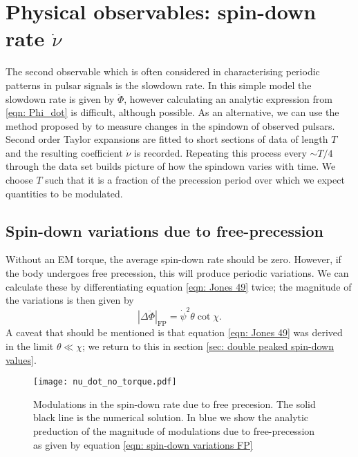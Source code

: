 \documentclass[/home/greg/Thesis/main/main.tex]{subfiles}
\begin{document}
\graphicspath{{/home/greg/Neutron_star_modelling/SpindownRate/img/}}

\section{Physical observables: spin-down rate $\dot{\nu}$}

The second observable which is often considered in characterising periodic
patterns in pulsar signals is the slowdown rate. In this simple model the
slowdown rate is given by $\ddot{\Phi}$, however calculating an analytic
expression from \eqref{eqn: Phi_dot} is difficult, although possible. As an alternative, we
can use the method proposed by \citet{Lyne2010} to measure changes in the
spindown of observed pulsars. Second order Taylor expansions are fitted to
short sections of data of length $T$ and the resulting coefficient $\dot{\nu}$
is recorded. Repeating this process every $\sim T/4$ through the data set
builds picture of how the spindown varies with time. We choose $T$ such that it
is a fraction of the precession period over which we expect quantities to be
modulated.

\subsection{Spin-down variations due to free-precession}
Without an EM torque, the average spin-down rate should be zero. However, if
the body undergoes free precession, this will produce periodic variations. We can
calculate these by differentiating equation \eqref{eqn: Jones 49} twice; the magnitude
of the variations is then given by
\begin{equation}
    |\Delta\ddot{\Phi}|_{\mathrm{FP}} =\dot{\psi}^{2} \theta \cot\chi. 
    \label{eqn: spin-down variations FP}
\end{equation}
A caveat that should be mentioned is that equation \eqref{eqn: Jones 49} was 
derived in the limit $\theta \ll \chi$; we return to this in section \ref{sec:
double peaked spin-down values}.


\begin{figure}[ht]
\centering
	\texttt{[image: nu\_dot\_no\_torque.pdf]}
\caption{Modulations in the spin-down rate due to free precesion. The solid black
         line is the numerical solution. In blue we show the analytic 
         preduction of the magnitude of modulations due to free-precession as
         given by equation \eqref{eqn: spin-down variations FP}}
\label{fig: nu_dot no torque}
\end{figure}
\end{document}
